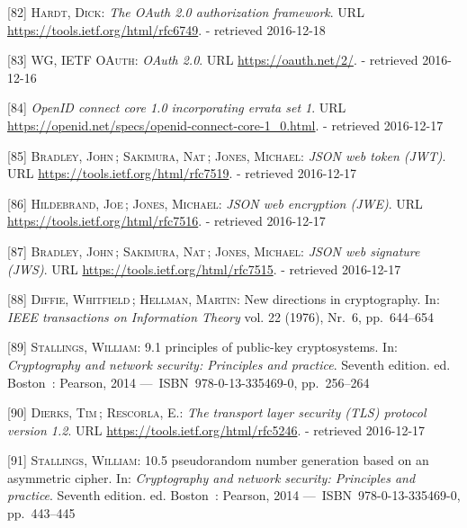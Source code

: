 \documentclass[12pt,english,a4paper,titlepage,cleardoublepage=empty,dottedtoc]{report}
\begin{document}
\hypertarget{ref-web_spec_oauth-2}{}
{[}82{]} \textsc{Hardt, Dick}: \emph{The OAuth 2.0 authorization
framework}. URL \url{https://tools.ietf.org/html/rfc6749}. - retrieved
2016-12-18

\hypertarget{ref-web_2016_oauth-2}{}
{[}83{]} \textsc{WG, IETF OAuth}: \emph{OAuth 2.0}. URL
\url{https://oauth.net/2/}. - retrieved 2016-12-16

\hypertarget{ref-web_spec_openid-connect-1}{}
{[}84{]} \emph{OpenID connect core 1.0 incorporating errata set 1}. URL
\url{https://openid.net/specs/openid-connect-core-1_0.html}. - retrieved
2016-12-17

\hypertarget{ref-web_spec_json-web-token}{}
{[}85{]} \textsc{Bradley, John}\,; \textsc{Sakimura, Nat}\,;
\textsc{Jones, Michael}: \emph{JSON web token (JWT)}. URL
\url{https://tools.ietf.org/html/rfc7519}. - retrieved 2016-12-17

\hypertarget{ref-web_spec_json-web-encryption}{}
{[}86{]} \textsc{Hildebrand, Joe}\,; \textsc{Jones, Michael}: \emph{JSON
web encryption (JWE)}. URL \url{https://tools.ietf.org/html/rfc7516}. -
retrieved 2016-12-17

\hypertarget{ref-web_spec_json-web-signature}{}
{[}87{]} \textsc{Bradley, John}\,; \textsc{Sakimura, Nat}\,;
\textsc{Jones, Michael}: \emph{JSON web signature (JWS)}. URL
\url{https://tools.ietf.org/html/rfc7515}. - retrieved 2016-12-17

\hypertarget{ref-paper_1976_d-h-key-exchange}{}
{[}88{]} \textsc{Diffie, Whitfield}\,; \textsc{Hellman, Martin}: New
directions in cryptography. In: \emph{IEEE transactions on Information
Theory} vol. 22 (1976), Nr.~6, pp.~644--654

\hypertarget{ref-book_2014_chapter-9-1-public-key-crypto}{}
{[}89{]} \textsc{Stallings, William}: 9.1 principles of public-key
cryptosystems. In: \emph{Cryptography and network security: Principles
and practice}. Seventh edition. ed. Boston~: Pearson, 2014
---~ISBN~978-0-13-335469-0, pp.~256--264

\hypertarget{ref-web_spec_tls}{}
{[}90{]} \textsc{Dierks, Tim}\,; \textsc{Rescorla, E.}: \emph{The
transport layer security (TLS) protocol version 1.2}. URL
\url{https://tools.ietf.org/html/rfc5246}. - retrieved 2016-12-17

\hypertarget{ref-book_2014_chapter-14-5-pki}{}
{[}91{]} \textsc{Stallings, William}: 10.5 pseudorandom number
generation based on an asymmetric cipher. In: \emph{Cryptography and
network security: Principles and practice}. Seventh edition. ed.
Boston~: Pearson, 2014 ---~ISBN~978-0-13-335469-0, pp.~443--445
\end{document}
